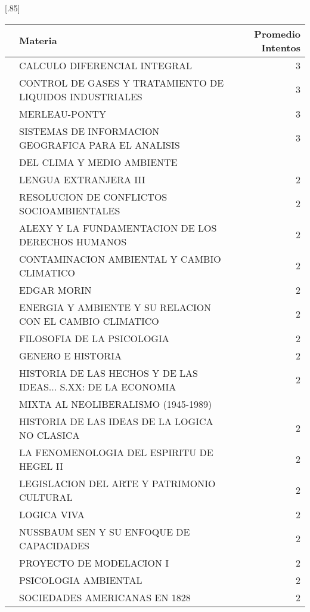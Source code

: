 \documentclass[12pt]{article}
\begin{document}
\begin{table}[ht]
\centering
\scalebox{0.75}[.85]{
\begin{tabular}{rlr}
  \hline
 & Materia & Promedio Intentos \\ 
  \hline
 & CALCULO DIFERENCIAL INTEGRAL & 3 \\ 
 & CONTROL DE GASES Y TRATAMIENTO DE LIQUIDOS INDUSTRIALES & 3 \\ 
 & MERLEAU-PONTY & 3 \\ 
 & SISTEMAS DE INFORMACION GEOGRAFICA PARA EL ANALISIS & 3 \\ 
 & DEL CLIMA Y MEDIO AMBIENTE &  \\ 
 & LENGUA EXTRANJERA III & 2 \\ 
 & RESOLUCION DE CONFLICTOS SOCIOAMBIENTALES & 2 \\ 
 & ALEXY Y LA FUNDAMENTACION DE LOS DERECHOS HUMANOS & 2 \\ 
 & CONTAMINACION AMBIENTAL Y CAMBIO CLIMATICO & 2 \\ 
 & EDGAR MORIN & 2 \\ 
 & ENERGIA Y AMBIENTE Y SU RELACION CON EL CAMBIO CLIMATICO & 2 \\ 
 & FILOSOFIA DE LA PSICOLOGIA & 2 \\ 
 & GENERO E HISTORIA & 2 \\ 
 & HISTORIA DE LAS HECHOS Y DE LAS IDEAS... S.XX: DE LA ECONOMIA & 2 \\ 
 & MIXTA AL NEOLIBERALISMO (1945-1989) &  \\ 
 & HISTORIA DE LAS IDEAS DE LA LOGICA NO CLASICA & 2 \\ 
 & LA FENOMENOLOGIA DEL ESPIRITU DE HEGEL II & 2 \\ 
 & LEGISLACION DEL ARTE Y PATRIMONIO CULTURAL & 2 \\ 
 & LOGICA VIVA & 2 \\ 
 & NUSSBAUM SEN Y SU ENFOQUE DE CAPACIDADES & 2 \\ 
 & PROYECTO DE MODELACION I & 2 \\ 
 & PSICOLOGIA AMBIENTAL & 2 \\ 
 & SOCIEDADES AMERICANAS EN 1828 & 2 \\ 
   \hline
\end{tabular}}
\end{table}
\end{document}
